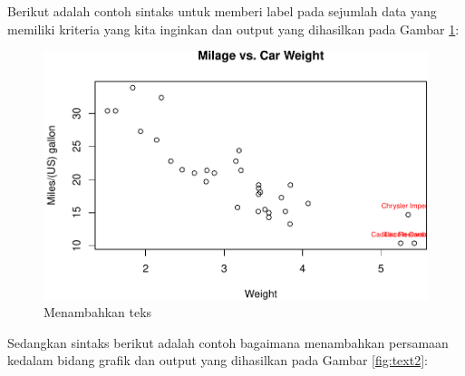 \documentclass[]{book}
\newenvironment{Shaded}{\begin{snugshade}}{\end{snugshade}}
\newcommand{\KeywordTok}[1]{\textcolor[rgb]{0.13,0.29,0.53}{\textbf{#1}}}
\newcommand{\DataTypeTok}[1]{\textcolor[rgb]{0.13,0.29,0.53}{#1}}
\newcommand{\DecValTok}[1]{\textcolor[rgb]{0.00,0.00,0.81}{#1}}
\newcommand{\FloatTok}[1]{\textcolor[rgb]{0.00,0.00,0.81}{#1}}
\newcommand{\StringTok}[1]{\textcolor[rgb]{0.31,0.60,0.02}{#1}}
\newcommand{\CommentTok}[1]{\textcolor[rgb]{0.56,0.35,0.01}{\textit{#1}}}
\newcommand{\OperatorTok}[1]{\textcolor[rgb]{0.81,0.36,0.00}{\textbf{#1}}}
\newcommand{\NormalTok}[1]{#1}
\begin{document}
Berikut adalah contoh sintaks untuk memberi label pada sejumlah data
yang memiliki kriteria yang kita inginkan dan output yang dihasilkan
pada Gambar \ref{fig:text}:

\begin{Shaded}
\end{Shaded}

\begin{figure}

{\centering \includegraphics[width=0.7\linewidth]{EnvStat_files/figure-latex/text-1} 

}

\caption{Menambahkan teks}\label{fig:text}
\end{figure}

Sedangkan sintaks berikut adalah contoh bagaimana menambahkan persamaan
kedalam bidang grafik dan output yang dihasilkan pada Gambar
\ref{fig:text2}:
\end{document}
